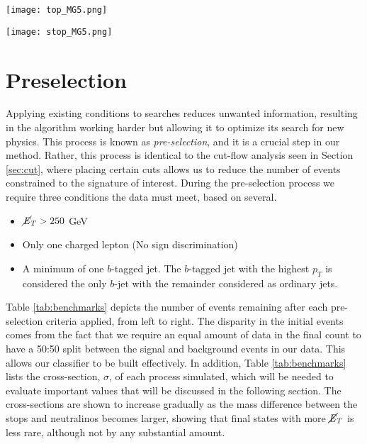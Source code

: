 \noindent\begin{minipage}{\textwidth}
\centering
  \begin{minipage}[htbp]{0.45\textwidth}
    \centering
    \texttt{[image: top\_MG5.png]}
    \label{fig:bkrdFeyn}
  \end{minipage}
  \hfill
  \begin{minipage}[htbp]{0.45\textwidth}
    \centering
    \texttt{[image: stop\_MG5.png]}
    \label{fig:sigFeyn}
  \end{minipage}
\end{minipage}
\section{Preselection}
Applying existing conditions to searches reduces unwanted information, resulting in the algorithm working harder but allowing it to optimize its search for new physics. This process is known as \textit{pre-selection}, and it is a crucial step in our method. Rather, this process is identical to the cut-flow analysis seen in Section \ref{sec:cut}, where placing certain cuts allows us to reduce the number of events constrained to the signature of interest. During the pre-selection process we require three conditions the data must meet, based on several. 
\begin{itemize}
    \item $\cancel{\it{E}}_{T}>250$ GeV
    \item Only one charged lepton (No sign discrimination)
    \item A minimum of one $b$-tagged jet. The $b$-tagged jet with the highest $p_T$ is considered the only $b$-jet with the remainder considered as ordinary jets.\\
\end{itemize}

Table \ref{tab:benchmarks} depicts the number of events remaining after each pre-selection criteria applied, from left to right. The disparity in the initial events comes from the fact that we require an equal amount of data in the final count to have a 50:50 split between the signal and background events in our data. This allows our classifier to be built effectively. In addition, Table \ref{tab:benchmarks} lists the cross-section, $\sigma$, of each process simulated, which will be needed to evaluate important values that will be discussed in the following section. The cross-sections are shown to increase gradually as the mass difference between the stops and neutralinos becomes larger, showing that final states with more $\cancel{\it{E}}_{T}$ is less rare, although not by any substantial amount. \\

